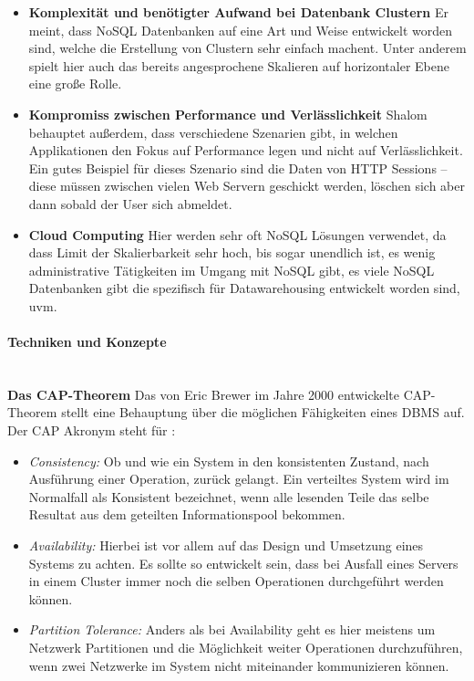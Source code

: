 \begin{itemize}
	\item \textbf{Komplexität und benötigter Aufwand bei Datenbank Clustern}\newline
	 Er meint, dass NoSQL Datenbanken auf eine Art und Weise entwickelt worden sind, welche die Erstellung von Clustern sehr einfach machent. Unter anderem spielt hier auch das bereits angesprochene Skalieren auf horizontaler Ebene eine große Rolle.
	
	\item \textbf{Kompromiss zwischen Performance und Verlässlichkeit}\newline
	 Shalom behauptet außerdem, dass verschiedene Szenarien gibt, in welchen Applikationen den Fokus auf Performance legen und nicht auf Verlässlichkeit. Ein gutes Beispiel für dieses Szenario sind die Daten von HTTP Sessions – diese müssen zwischen vielen Web Servern geschickt werden, löschen sich aber dann sobald der User sich abmeldet.

	\item \textbf{Cloud Computing}\newline
	 Hier werden sehr oft NoSQL Lösungen verwendet, da dass Limit der Skalierbarkeit sehr hoch, bis sogar unendlich ist, es wenig administrative Tätigkeiten im Umgang mit NoSQL gibt, es viele NoSQL Datenbanken gibt die spezifisch für Datawarehousing entwickelt worden sind, uvm.
\end{itemize}

\paragraph{Techniken und Konzepte}\mbox{}\\
\textbf{Das CAP-Theorem\newline}
Das von Eric Brewer im Jahre 2000 entwickelte CAP-Theorem stellt eine Behauptung über die möglichen Fähigkeiten eines DBMS auf. Der CAP Akronym steht für \cite{MELD.CH2-noSQL.capTheorem}:

\begin{itemize}
	\item \textit{Consistency:} Ob und wie ein System in den konsistenten Zustand, nach Ausführung einer Operation, zurück gelangt. Ein verteiltes System wird im Normalfall als Konsistent bezeichnet, wenn alle lesenden Teile das selbe Resultat aus dem geteilten Informationspool bekommen.

	\item \textit{Availability:} Hierbei ist vor allem auf das Design und Umsetzung eines Systems zu achten. Es sollte so entwickelt sein, dass bei Ausfall eines Servers in einem Cluster immer noch die selben Operationen durchgeführt werden können.

	\item \textit{Partition Tolerance:} Anders als bei Availability geht es hier meistens um Netzwerk Partitionen und die Möglichkeit weiter Operationen durchzuführen, wenn zwei Netzwerke im System nicht miteinander kommunizieren können.
\end{itemize}

